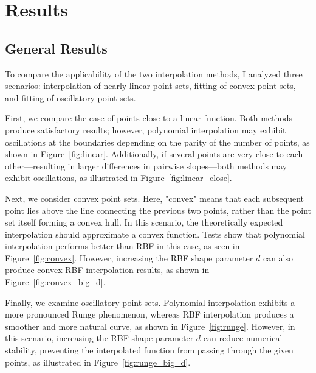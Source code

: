 \documentclass[12pt,a4paper]{report}
\begin{document}
    \chapter{Results}
        \section{General Results}
            To compare the applicability of the two interpolation methods, I analyzed three scenarios: interpolation of nearly linear point sets, fitting of convex point sets, and fitting of oscillatory point sets.

            First, we compare the case of points close to a linear function. Both methods produce satisfactory results; however, polynomial interpolation may exhibit oscillations at the boundaries depending on the parity of the number of points, as shown in Figure~\ref{fig:linear}. Additionally, if several points are very close to each other—resulting in larger differences in pairwise slopes—both methods may exhibit oscillations, as illustrated in Figure~\ref{fig:linear_close}.

            Next, we consider convex point sets. Here, "convex" means that each subsequent point lies above the line connecting the previous two points, rather than the point set itself forming a convex hull. In this scenario, the theoretically expected interpolation should approximate a convex function. Tests show that polynomial interpolation performs better than RBF in this case, as seen in Figure~\ref{fig:convex}. However, increasing the RBF shape parameter $d$ can also produce convex RBF interpolation results, as shown in Figure~\ref{fig:convex_big_d}.

            Finally, we examine oscillatory point sets. Polynomial interpolation exhibits a more pronounced Runge phenomenon, whereas RBF interpolation produces a smoother and more natural curve, as shown in Figure~\ref{fig:runge}. However, in this scenario, increasing the RBF shape parameter $d$ can reduce numerical stability, preventing the interpolated function from passing through the given points, as illustrated in Figure~\ref{fig:runge_big_d}.
            
\end{document}
